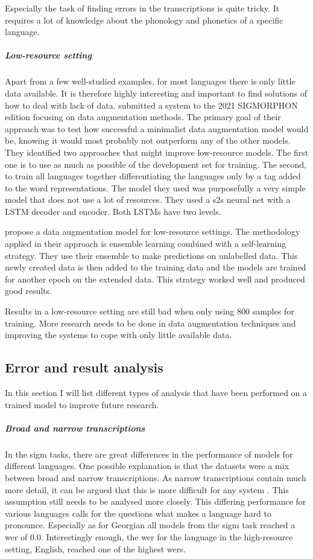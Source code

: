 Especially the task of finding errors in the transcriptions is quite tricky. It requires a lot of knowledge about the phonology and phonetics of a specific language. 

\subparagraph{Low-resource setting}
Apart from a few well-studied examples, for most languages there is only little data available. It is therefore highly interesting and important to find solutions of how to deal with lack of data. \cite{hammond-2021-data} submitted a system to the 2021 SIGMORPHON edition focusing on data augmentation methods. The primary goal of their approach was to test how successful a minimalist data augmentation model would be, knowing it would most probably not outperform any of the other models. They identified two approaches that might improve low-resource models. The first one is to use as much as possible of the development set for training. The second, to train all languages together differentiating the languages only by a tag added to the word representations. The model they used was purposefully a very simple model that does not use a lot of resources. They used a \ac{s2s} neural net with a LSTM decoder and encoder. Both LSTMs have two levels. 

\citet{yu-etal-2020} propose a data augmentation model for low-resource settings. The methodology applied in their approach is ensemble learning combined with a self-learning strategy. They use their ensemble to make predictions on unlabelled data. This newly created data is then added to the training data and the models are trained for another epoch on the extended data. This strategy worked well and produced good results. 

Results in a low-resource setting are still bad when only using 800 samples for training. More research needs to be done in data augmentation techniques and improving the systems to cope with only little available data.


\subsection{Error and result analysis}
In this section I will list different types of analysis that have been performed on a trained model to improve future research.

\subparagraph{Broad and narrow transcriptions}
In the \ac{sigm} tasks, there are great differences in the performance of models for different languages. One possible explanation is that the datasets were a mix between broad and narrow transcriptions. As narrow transcriptions contain much more detail, it can be argued that this is more difficult for any system \citep{Ashby&Bartley.2021}. This assumption still needs to be analysed more closely. This differing performance for various languages calls for the questions what makes a language hard to pronounce. Especially as for Georgian all models from the \ac{sigm} task reached a \ac{wer} of $0.0$. Interestingly enough, the \ac{wer} for the language in the high-resource setting, English, reached one of the highest \acp{wer}.

